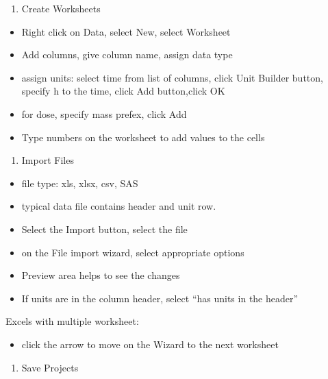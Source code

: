 \documentclass[
  letterpaper,
  DIV=11,
  numbers=noendperiod]{scrreprt}
\providecommand{\tightlist}{%
  \setlength{\itemsep}{0pt}\setlength{\parskip}{0pt}}\usepackage{longtable,booktabs,array}
\begin{document}
\begin{enumerate}
\def\labelenumi{\arabic{enumi}.}
\setcounter{enumi}{1}
\tightlist
\item
  Create Worksheets
\end{enumerate}

\begin{itemize}
\tightlist
\item
  Right click on Data, select New, select Worksheet
\item
  Add columns, give column name, assign data type
\item
  assign units: select time from list of columns, click Unit Builder
  button, specify h to the time, click Add button,click OK
\item
  for dose, specify mass prefex, click Add
\item
  Type numbers on the worksheet to add values to the cells
\end{itemize}

\begin{enumerate}
\def\labelenumi{\arabic{enumi}.}
\setcounter{enumi}{2}
\tightlist
\item
  Import Files
\end{enumerate}

\begin{itemize}
\tightlist
\item
  file type: xls, xlsx, csv, SAS
\item
  typical data file contains header and unit row.
\item
  Select the Import button, select the file
\item
  on the File import wizard, select appropriate options
\item
  Preview area helps to see the changes
\item
  If units are in the column header, select ``has units in the header''
\end{itemize}

Excels with multiple worksheet:

\begin{itemize}
\tightlist
\item
  click the arrow to move on the Wizard to the next worksheet
\end{itemize}

\begin{enumerate}
\def\labelenumi{\arabic{enumi}.}
\setcounter{enumi}{3}
\tightlist
\item
  Save Projects
\end{enumerate}
\end{document}
